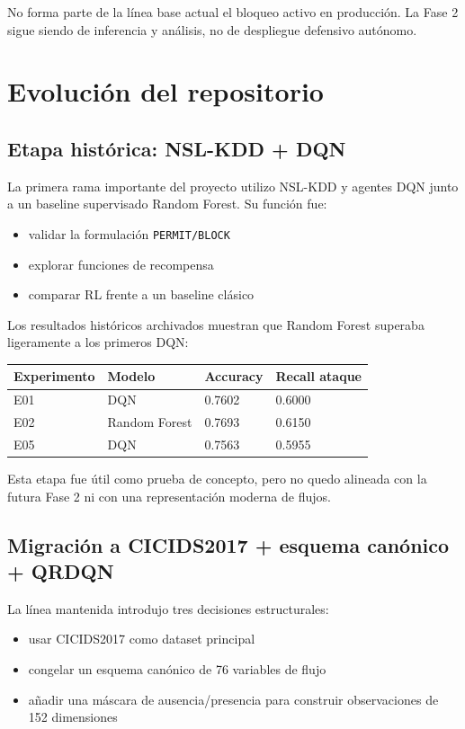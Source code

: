 \documentclass[12pt,a4paper]{report}
\begin{document}
No forma parte de la línea base actual el bloqueo activo en producción. La Fase 2
sigue siendo de inferencia y análisis, no de despliegue defensivo autónomo.

\chapter{Evolución del repositorio}

\section{Etapa histórica: NSL-KDD + DQN}

La primera rama importante del proyecto utilizo NSL-KDD y agentes DQN junto a un
baseline supervisado Random Forest. Su función fue:

\begin{itemize}
    \item validar la formulación \texttt{PERMIT/BLOCK}
    \item explorar funciones de recompensa
    \item comparar RL frente a un baseline clásico
\end{itemize}

Los resultados históricos archivados muestran que Random Forest superaba
ligeramente a los primeros DQN:

\begin{center}
\begin{tabular}{llll}
\toprule
Experimento & Modelo & Accuracy & Recall ataque \\
\midrule
E01 & DQN & 0.7602 & 0.6000 \\
E02 & Random Forest & 0.7693 & 0.6150 \\
E05 & DQN & 0.7563 & 0.5955 \\
\bottomrule
\end{tabular}
\end{center}

Esta etapa fue útil como prueba de concepto, pero no quedo alineada con la futura
Fase 2 ni con una representación moderna de flujos.

\section{Migración a CICIDS2017 + esquema canónico + QRDQN}

La línea mantenida introdujo tres decisiones estructurales:

\begin{itemize}
    \item usar CICIDS2017 como dataset principal
    \item congelar un esquema canónico de 76 variables de flujo
    \item añadir una máscara de ausencia/presencia para construir observaciones de 152 dimensiones
\end{itemize}
\end{document}

